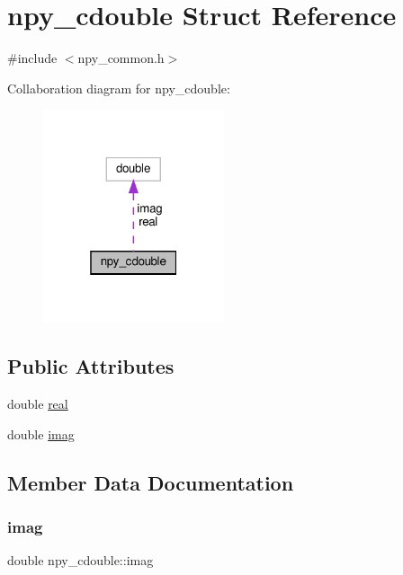 \hypertarget{structnpy__cdouble}{}\section{npy\+\_\+cdouble Struct Reference}
\label{structnpy__cdouble}


{\ttfamily \#include $<$npy\+\_\+common.\+h$>$}



Collaboration diagram for npy\+\_\+cdouble\+:
\nopagebreak
\begin{figure}[H]
\begin{center}
\leavevmode
\includegraphics[width=151pt]{structnpy__cdouble__coll__graph}
\end{center}
\end{figure}
\subsection*{Public Attributes}
\begin{DoxyCompactItemize}
\item 
double \hyperlink{structnpy__cdouble_a872c7c66bd199d63a9f1aa85b0cf382b}{real}
\item 
double \hyperlink{structnpy__cdouble_a46c97954806608c41f6eae16c2c21556}{imag}
\end{DoxyCompactItemize}


\subsection{Member Data Documentation}
\mbox{\label{structnpy__cdouble_a46c97954806608c41f6eae16c2c21556}} 
\subsubsection{\texorpdfstring{imag}{imag}}
{\footnotesize\ttfamily double npy\+\_\+cdouble\+::imag}

